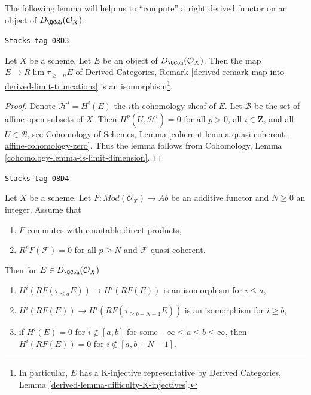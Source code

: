 The following lemma will help us to ``compute'' a right derived functor
on an object of $D_\QCoh(\mathcal{O}_X)$.

\begin{lemma}
\label{perfect-lemma-nice-K-injective}
\href{https://stacks.math.columbia.edu/tag/08D3}{\texttt{Stacks tag 08D3}}

Let $X$ be a scheme. Let $E$ be an object of
$D_\QCoh(\mathcal{O}_X)$. Then the map $E \to R\lim \tau_{\geq -n}E$ of
Derived Categories, Remark
\ref{derived-remark-map-into-derived-limit-truncations}
is an isomorphism\footnote{In particular,
$E$ has a K-injective representative by
Derived Categories, Lemma \ref{derived-lemma-difficulty-K-injectives}.}.
\end{lemma}

\begin{proof}
Denote $\mathcal{H}^i = H^i(E)$ the $i$th cohomology sheaf of $E$.
Let $\mathcal{B}$ be the set of affine open subsets of $X$. Then
$H^p(U, \mathcal{H}^i) = 0$ for all $p > 0$, all $i \in \mathbf{Z}$,
and all $U \in \mathcal{B}$, see
Cohomology of Schemes, Lemma
\ref{coherent-lemma-quasi-coherent-affine-cohomology-zero}.
Thus the lemma follows from
Cohomology, Lemma \ref{cohomology-lemma-is-limit-dimension}.
\end{proof}

\begin{lemma}
\label{perfect-lemma-application-nice-K-injective}
\href{https://stacks.math.columbia.edu/tag/08D4}{\texttt{Stacks tag 08D4}}

Let $X$ be a scheme. Let $F : \textit{Mod}(\mathcal{O}_X) \to \textit{Ab}$
be an additive functor and $N \geq 0$ an integer. Assume that
\begin{enumerate}
\item $F$ commutes with countable direct products,
\item $R^pF(\mathcal{F}) = 0$ for all $p \geq N$ and $\mathcal{F}$
quasi-coherent.
\end{enumerate}
Then for $E \in D_\QCoh(\mathcal{O}_X)$
\begin{enumerate}
\item $H^i(RF(\tau_{\leq a}E)) \to H^i(RF(E))$ is an isomorphism
for $i \leq a$,
\item $H^i(RF(E)) \to H^i(RF(\tau_{\geq b - N + 1}E))$ is an isomorphism
for $i \geq b$,
\item if $H^i(E) = 0$ for $i \not \in [a, b]$ for some
$-\infty \leq a \leq b \leq \infty$, then $H^i(RF(E)) = 0$
for $i \not \in [a, b + N - 1]$.
\end{enumerate}
\end{lemma}

